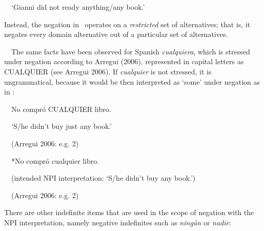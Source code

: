 \begin{styleStandard}
\ \ ‘Gianni did not ready anything/any book.’
\end{styleStandard}

\begin{styleStandard}
Instead, the negation in \ operates on a \textit{restricted} set of alternatives; that is, it negates every domain alternative out of a particular set of alternatives.
\end{styleStandard}

\begin{styleStandard}
\ \ The same facts have been observed for Spanish \textit{cualquiera}, which is stressed under negation according to Arregui (2006), represented in capital letters as CUALQUIER (see Arregui 2006). If \textit{cualquier} is not stressed, it is ungrammatical, because it would be then interpreted as ‘some’ under negation as in :
\end{styleStandard}

\begin{styleStandard}
\ \ No compró \MakeUppercase{cualquier} libro.
\end{styleStandard}

\begin{styleStandard}
\ \ ‘S/he didn't buy just any book.’
\end{styleStandard}

\begin{styleStandard}
\ \ (Arregui 2006: e.g. 2)
\end{styleStandard}

\begin{styleStandard}
\label{bkm:Ref533953565}\ \ *No compró cualquier libro.
\end{styleStandard}

\begin{styleStandard}
\ \ (intended NPI interpretation: ‘S/he didn’t buy any book.’) 
\end{styleStandard}

\begin{styleStandard}
\ \ (Arregui 2006: e.g. 2)
\end{styleStandard}

\begin{styleStandard}
There are other indefinite items that are used in the scope of negation with the NPI interpretation, namely negative indefinites such as \textit{ningún} or \textit{nadie}:
\end{styleStandard}

